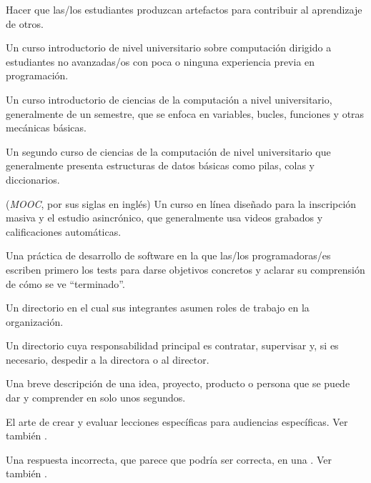\begin{description}
 Hacer que las/los estudiantes
produzcan artefactos para contribuir al aprendizaje de otros.

 Un curso introductorio de nivel universitario sobre computación
dirigido a estudiantes no avanzadas/os con poca o ninguna experiencia previa en programación.

 Un curso introductorio de ciencias de la computación a nivel universitario,
generalmente de un semestre, que se enfoca en variables, bucles, funciones y otras mecánicas básicas.

 Un segundo curso de ciencias de la computación de nivel universitario
que generalmente presenta estructuras de datos básicas como pilas, colas y diccionarios.

 (\emph{MOOC}, por sus siglas en inglés) Un curso en línea diseñado para la inscripción masiva y el estudio asincrónico, que generalmente usa videos grabados y calificaciones automáticas.

 Una práctica de desarrollo
de software en la que las/los programadoras/es escriben primero los tests
para darse objetivos concretos y aclarar su comprensión de cómo se ve ``terminado''.

 Un directorio en el cual sus integrantes asumen roles de trabajo en la organización.

 Un directorio cuya responsabilidad principal es
contratar, supervisar y, si es necesario, despedir a la directora o al director.

 Una breve descripción de una idea,
proyecto, producto o persona que se puede dar y comprender en solo unos segundos.

 El arte de crear y evaluar
lecciones específicas para audiencias específicas. Ver también
.

 Una respuesta incorrecta, que parece que podría ser correcta, 
en una . Ver también
.


\end{description}

